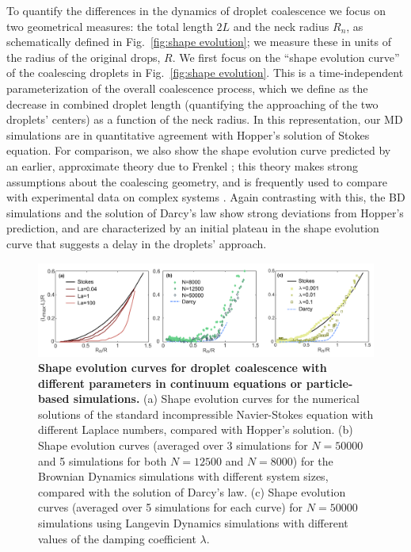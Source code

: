 \documentclass[%
reprint,
amsmath,amssymb,
aps,
]{revtex4-2}
\begin{document}
 
	To quantify the differences in the dynamics of droplet coalescence we focus on two geometrical measures: the total length $2L$ and the neck radius $R_n$, as schematically defined in Fig.~\ref{fig:shape evolution}; we measure these in units of the radius of the original drops, $R$. We first focus on the ``shape evolution curve'' of the coalescing droplets in Fig.~\ref{fig:shape evolution}. This is a time-independent parameterization of the overall coalescence process, which we define as the decrease in combined droplet length (quantifying the approaching of the two droplets' centers) as a function of the neck radius. In this representation, our MD simulations are in quantitative agreement with Hopper's solution of Stokes equation. For comparison, we also show the shape evolution curve predicted by an earlier, approximate theory due to Frenkel \cite{frenkel1945viscous}; this theory makes strong assumptions about the coalescing geometry, and is frequently used to compare with experimental data on complex systems \cite{flennerKineticMonteCarlo2012,grosserCellNucleusShape2021a,koshelevaCellSpheroidFusion2020a}. Again contrasting with this, the BD simulations and the solution of Darcy's law show strong deviations from Hopper's prediction, and are characterized by an initial plateau in the shape evolution curve that suggests a delay in the droplets' approach.	

	\begin{figure}[htb]
		\centering
		\includegraphics[width=\textwidth]{Figure4.pdf}
		\caption{\textbf{Shape evolution curves for droplet coalescence with different parameters in continuum equations or particle-based simulations.} (a) Shape evolution curves for the numerical solutions of the standard incompressible Navier-Stokes equation with different Laplace numbers, compared with Hopper's solution. (b) Shape evolution curves (averaged over 3 simulations for $N=50000$ and 5 simulations for both $N=12500$ and $N=8000$) for the Brownian Dynamics simulations with different system sizes, compared with the solution of Darcy's law. (c) Shape evolution curves (averaged over 5 simulations for each curve) for $N=50000$ simulations using Langevin Dynamics simulations with different values of the damping coefficient $\lambda$.}
		\label{fig:diagram}
	\end{figure}
 
\end{document}
